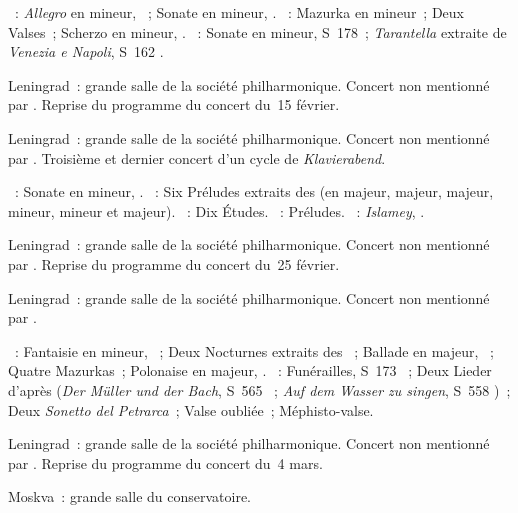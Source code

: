 \begin{description}
 \textsc{\Schumann{}}~: \emph{Allegro} en \kB mineur, ~; Sonate en
 \kF \Sharp mineur, .
 \textsc{\Chopin{}}~: Mazurka en \kB mineur~; Deux Valses~; Scherzo en \kB
 mineur, .
 \textsc{\Liszt{}}~: Sonate en \kB mineur, S~178~; \emph{Tarantella}
 extraite de \emph{Venezia e Napoli}, S~162 .
 \item[\DateWithWeekDay{1945-02-18}]
 Leningrad~: grande salle de la société philharmonique.
 Concert non mentionné par \citet[p.~423]{Scriabine}.
 Reprise du programme du concert du~15 février.
 \item[\DateWithWeekDay{1945-02-25}]
 Leningrad~: grande salle de la société philharmonique.
 Concert non mentionné par \citet[p.~423]{Scriabine}.
 Troisième et dernier concert d'un cycle de \emph{Klavierabend}.

 \textsc{\Glazounov{}}~: Sonate  en \kB \Flat mineur, .
 \textsc{\Rachmaninov{}}~: Six Préludes extraits des  (en \kE
 \Flat majeur, \kC majeur, \kF majeur, \kA mineur, \kG \Sharp mineur et \kB
 \Flat majeur).
 \textsc{\Scriabine{}}~: Dix Études.
 \textsc{\Chostakovitch{}}~: Préludes.
 \textsc{\Balakirev{}}~: \emph{Islamey}, .
 \item[\DateWithWeekDay{1945-02-27}]
 Leningrad~: grande salle de la société philharmonique.
 Concert non mentionné par \citet[p.~423]{Scriabine}.
 Reprise du programme du concert du~25 février.
 \item[\DateWithWeekDay{1945-03-04}]
 Leningrad~: grande salle de la société philharmonique.
 Concert non mentionné par \citet[p.~423]{Scriabine}.

 \textsc{\Chopin{}}~: Fantaisie en \kF mineur, ~; Deux Nocturnes
 extraits des ~; Ballade  en \kA \Flat majeur,
 ~; Quatre Mazurkas~; Polonaise en \kA \Flat majeur, .
 \textsc{\Liszt{}}~: Funérailles, S~173 ~; Deux Lieder d'après
 \Schubert{} (\emph{Der Müller und der Bach}, S~565 ~; \emph{Auf
 dem Wasser zu singen}, S~558 )~; Deux \emph{Sonetto del
 Petrarca}~; Valse oubliée~; Méphisto-valse.
 \item[\DateWithWeekDay{1945-03-09}]
 Leningrad~: grande salle de la société philharmonique.
 Concert non mentionné par \citet[p.~423]{Scriabine}.
 Reprise du programme du concert du~4 mars.
 \item[\DateWithWeekDay{1945-03-23}]
 Moskva~: grande salle du conservatoire.


\end{description}
